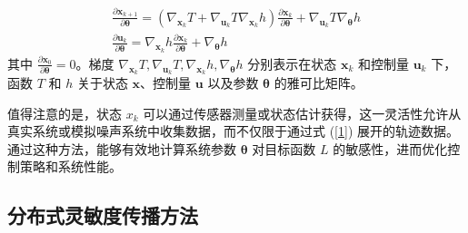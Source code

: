 \documentclass[lang=chs, degree=master, blindreview=true, winfonts=true]{yanputhesis}
\begin{document}
\begin{equation}
	\begin{gathered}
		\frac{\partial \bm x_{k+1}}{\partial \bm \theta} = ({\nabla}_{\bm x_k}  T + {\nabla}_{\bm u_k} T {\nabla}_{\bm x_k} h) \frac{\partial \bm x_k}{\partial \bm \theta} + {\nabla}_{\bm u_k} T {\nabla_{\bm \theta}} h\\
		\frac{\partial \bm u_k}{\partial \bm \theta} = {\nabla}_{\bm x_k} h \frac{\partial \bm x_k}{\partial \bm \theta} + {\nabla_{\bm \theta}} h
	\end{gathered}
\end{equation}
其中 \( \frac{\partial \bm x_0}{\partial \bm \theta} = 0 \)。梯度
\( {\nabla}_{\bm x_k} T, {\nabla}_{\bm u_k} T, {\nabla}_{\bm x_k} h, {\nabla_{\bm \theta}} h \) 分别表示在状态 $\bm x_k$ 和控制量 $\bm u_k$ 下，函数 $T$ 和 $h$ 关于状态 $\bm x$、控制量 $\bm u$ 以及参数 $\bm \theta$ 的雅可比矩阵。

值得注意的是，状态 $x_k$ 可以通过传感器测量或状态估计获得，这一灵活性允许从真实系统或模拟噪声系统中收集数据，而不仅限于通过式 (\ref{1}) 展开的轨迹数据。
通过这种方法，能够有效地计算系统参数 $\bm \theta$ 对目标函数 $L$ 的敏感性，进而优化控制策略和系统性能。

\subsection{分布式灵敏度传播方法}

\end{document}
